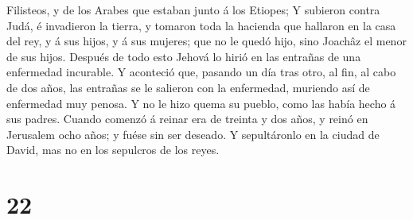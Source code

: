 Filisteos, y de los Arabes que estaban junto á los Etiopes;
 Y subieron contra Judá, é invadieron la tierra, y
tomaron toda la hacienda que hallaron en la casa del rey, y á sus hijos,
y á sus mujeres; que no le quedó hijo, sino Joachâz el menor de sus
hijos.  Después de todo esto Jehová lo hirió en las
entrañas de una enfermedad incurable.  Y aconteció que,
pasando un día tras otro, al fin, al cabo de dos años, las entrañas se
le salieron con la enfermedad, muriendo así de enfermedad muy penosa. Y
no le hizo quema su pueblo, como las había hecho á sus padres.
 Cuando comenzó á reinar era de treinta y dos años, y
reinó en Jerusalem ocho años; y fuése sin ser deseado. Y sepultáronlo en
la ciudad de David, mas no en los sepulcros de los reyes.

\hypertarget{section-21}{%
\section{22}\label{section-21}}

